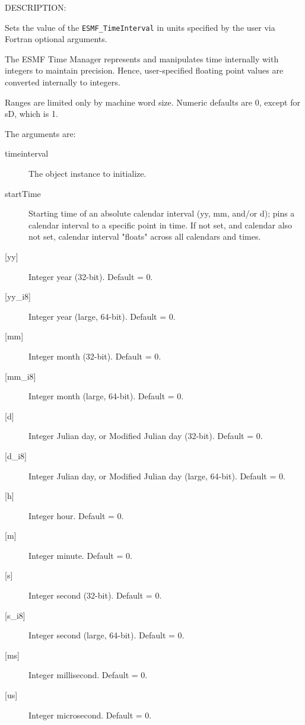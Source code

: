 {\sf DESCRIPTION:\\ }


       Sets the value of the {\tt ESMF\_TimeInterval} in units specified by
       the user via Fortran optional arguments.
  
       The ESMF Time Manager represents and manipulates time internally with
       integers to maintain precision.  Hence, user-specified floating point
       values are converted internally to integers.
  
       Ranges are limited only by machine word size.  Numeric defaults are 0,
       except for sD, which is 1.
  
       The arguments are:
       \begin{description}
       \item[timeinterval]
            The object instance to initialize.
       \item[startTime]
            Starting time of an absolute calendar interval 
            (yy, mm, and/or d); pins a calendar interval to a specific point 
            in time.  If not set, and calendar also not set, calendar interval 
            "floats" across all calendars and times.
       \item[{[yy]}]
            Integer year (32-bit).  Default = 0.
       \item[{[yy\_i8]}]
            Integer year (large, 64-bit).  Default = 0.
       \item[{[mm]}]
            Integer month (32-bit).  Default = 0.
       \item[{[mm\_i8]}]
            Integer month (large, 64-bit).  Default = 0.
       \item[{[d]}]
            Integer Julian day, or Modified Julian day (32-bit).  Default = 0.
       \item[{[d\_i8]}]
            Integer Julian day, or Modified Julian day (large, 64-bit).
            Default = 0.
       \item[{[h]}]
            Integer hour.  Default = 0.
       \item[{[m]}]
            Integer minute.  Default = 0.
       \item[{[s]}]
            Integer second (32-bit).  Default = 0.
       \item[{[s\_i8]}]
            Integer second (large, 64-bit).  Default = 0.
       \item[{[ms]}]
            Integer millisecond.  Default = 0.
       \item[{[us]}]
            Integer microsecond.  Default = 0.

\end{description}
